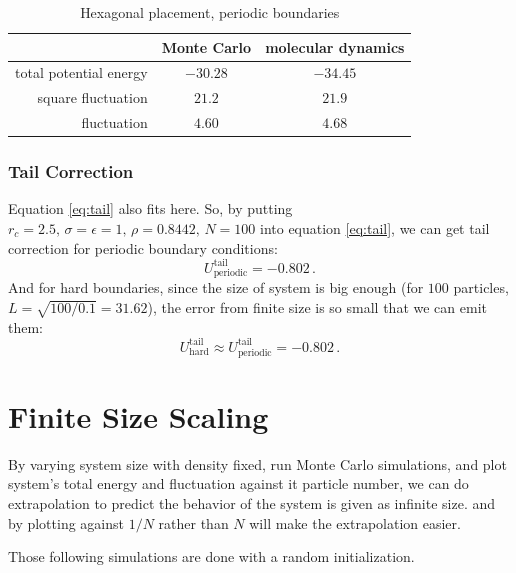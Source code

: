 \documentclass[UTF8,a4paper]{article}
\begin{document}
\begin{table}[H]
	\centering
	\caption{Hexagonal placement, periodic boundaries}
	\begin{tabular}{rcc}
		\toprule
		\toprule
		                       & Monte Carlo & molecular dynamics \\ \midrule
		total potential energy & $-30.28$    & $-34.45$           \\
		square fluctuation     & $21.2$      & $21.9$             \\
		fluctuation            & $4.60$      & $4.68$             \\
		\bottomrule
	\end{tabular}%
	\label{tab:hex_hard_2}%
\end{table}%
\subsubsection{Tail Correction}
Equation \eqref{eq:tail} also fits here. So, by putting $r_c = 2.5, \, \sigma = \epsilon = 1, \,\rho = 0.8442, \,N = 100$ into equation \eqref{eq:tail}, we can 
get tail correction for periodic boundary conditions:
\begin{equation}
	U^{\text{tail}}_{\text{periodic}} = -0.802\,.
\end{equation}
And for hard boundaries, since the size of system is big enough (for $100$ particles, $L = \sqrt{100/0.1} = 31.62$), the error from finite size is so small that we can 
emit them:
\begin{equation}
	U^{\text{tail}}_{\text{hard}} \approx U^{\text{tail}}_{\text{periodic}} = -0.802\,.
\end{equation}

\section{Finite Size Scaling}
By varying system size with density fixed, run Monte Carlo simulations, and plot system's total energy and fluctuation against it particle number, we can 
do extrapolation to predict the behavior of the system is given as infinite size. and by plotting against $1/N$ rather than $N$ will make the extrapolation 
easier.

Those following simulations are done with a random initialization. 
\end{document}
